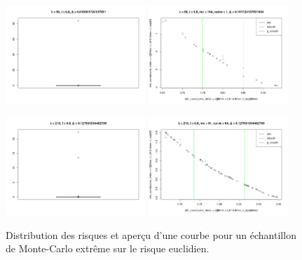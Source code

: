 
\begin{figure}[H]
	\centering
	\begin{minipage}{\linewidth}
		\includegraphics[width=0.47\textwidth]{Images/indiv_vs_glob/qq160.png}
		\includegraphics[width=0.47\textwidth]{Images/indiv_vs_glob/lbd60mc164c1.png}
	\end{minipage}

	\begin{minipage}{\linewidth}
		\includegraphics[width=0.47\textwidth]{Images/indiv_vs_glob/qq210.png}
		\includegraphics[width=0.47\textwidth]{Images/indiv_vs_glob/lbd210_mc91_c64.png}
	\end{minipage}
	\caption{Distribution des risques et aperçu d'une courbe pour un échantillon de Monte-Carlo extrême sur le risque euclidien.}
	\label{fig:dist_R_eucl_curves}
\end{figure}

